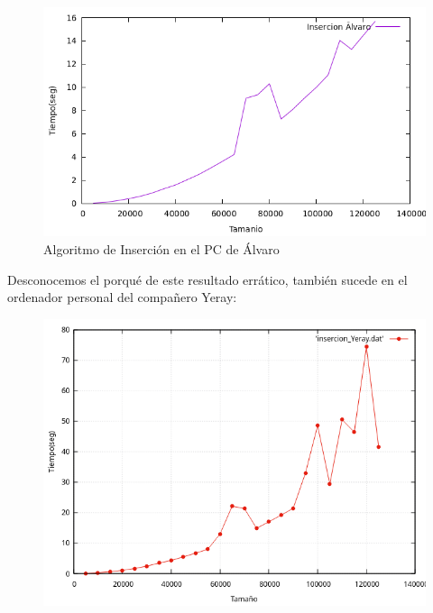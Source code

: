 \documentclass[12pt, spanish]{article}
\begin{document}
\begin{figure}[H]
  \centering
  \includegraphics[scale = 0.7]{insercionAlvaro.png}
  \caption{Algoritmo de Inserción en el PC de Álvaro}
\end{figure}

Desconocemos el porqué de este resultado errático, también sucede en el ordenador personal del compañero Yeray:

\begin{figure}[H]
  \centering
  \includegraphics[scale = 0.7]{insercionYeray.png}
\end{figure}
\end{document}
